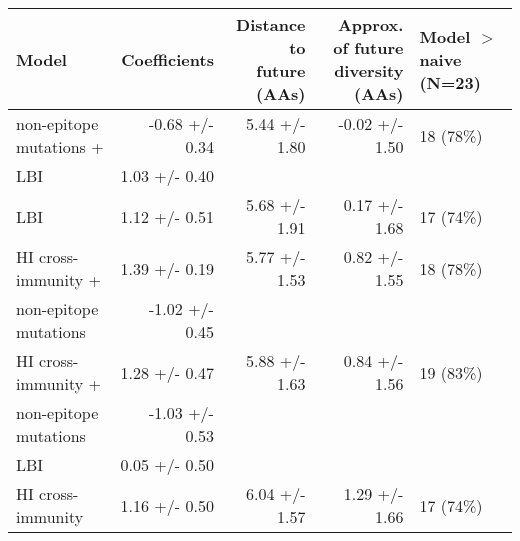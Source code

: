\begin{tabular*}{1.0\textwidth}{lrrrl}
\toprule
                             Model &    Coefficients & \makecell{Distance to \\ future (AAs)} & \makecell{Approx. of future \\ diversity (AAs)} & \makecell[l]{Model $>$ naive \\ (N=23)} \\
\midrule
           non-epitope mutations + &  -0.68 +/- 0.34 &                          5.44 +/- 1.80 &                                  -0.02 +/- 1.50 &                               18 (78\%) \\
                   \hspace{3mm}LBI &   1.03 +/- 0.40 &                                        &                                                 &                                         \\
                               LBI &   1.12 +/- 0.51 &                          5.68 +/- 1.91 &                                   0.17 +/- 1.68 &                               17 (74\%) \\
               HI cross-immunity + &   1.39 +/- 0.19 &                          5.77 +/- 1.53 &                                   0.82 +/- 1.55 &                               18 (78\%) \\
 \hspace{3mm}non-epitope mutations &  -1.02 +/- 0.45 &                                        &                                                 &                                         \\
               HI cross-immunity + &   1.28 +/- 0.47 &                          5.88 +/- 1.63 &                                   0.84 +/- 1.56 &                               19 (83\%) \\
 \hspace{3mm}non-epitope mutations &  -1.03 +/- 0.53 &                                        &                                                 &                                         \\
                   \hspace{3mm}LBI &   0.05 +/- 0.50 &                                        &                                                 &                                         \\
                 HI cross-immunity &   1.16 +/- 0.50 &                          6.04 +/- 1.57 &                                   1.29 +/- 1.66 &                               17 (74\%) \\

\end{tabular*}

